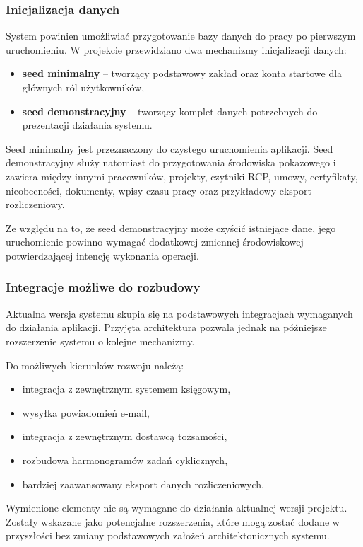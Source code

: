 \subsubsection{Inicjalizacja danych}

System powinien umożliwiać przygotowanie bazy danych do pracy po pierwszym uruchomieniu. W projekcie przewidziano dwa mechanizmy inicjalizacji danych:
\begin{itemize}
    \item \textbf{seed minimalny} -- tworzący podstawowy zakład oraz konta startowe dla głównych ról użytkowników,
    \item \textbf{seed demonstracyjny} -- tworzący komplet danych potrzebnych do prezentacji działania systemu.
\end{itemize}

Seed minimalny jest przeznaczony do czystego uruchomienia aplikacji. Seed demonstracyjny służy natomiast do przygotowania środowiska pokazowego i zawiera między innymi pracowników, projekty, czytniki RCP, umowy, certyfikaty, nieobecności, dokumenty, wpisy czasu pracy oraz przykładowy eksport rozliczeniowy.

Ze względu na to, że seed demonstracyjny może czyścić istniejące dane, jego uruchomienie powinno wymagać dodatkowej zmiennej środowiskowej potwierdzającej intencję wykonania operacji.

\subsubsection{Integracje możliwe do rozbudowy}

Aktualna wersja systemu skupia się na podstawowych integracjach wymaganych do działania aplikacji. Przyjęta architektura pozwala jednak na późniejsze rozszerzenie systemu o kolejne mechanizmy.

Do możliwych kierunków rozwoju należą:
\begin{itemize}
    \item integracja z zewnętrznym systemem księgowym,
    \item wysyłka powiadomień e-mail,
    \item integracja z zewnętrznym dostawcą tożsamości,
    \item rozbudowa harmonogramów zadań cyklicznych,
    \item bardziej zaawansowany eksport danych rozliczeniowych.
\end{itemize}

Wymienione elementy nie są wymagane do działania aktualnej wersji projektu. Zostały wskazane jako potencjalne rozszerzenia, które mogą zostać dodane w przyszłości bez zmiany podstawowych założeń architektonicznych systemu.